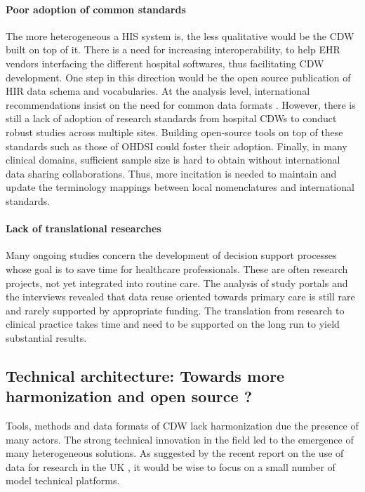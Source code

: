 \documentclass[french,12pt,twoside,a4paper]{book}
\begin{document}
\paragraph{Poor adoption of common standards} The more heterogeneous a HIS system is, the less qualitative would be the CDW
built on top of it. There is a need for increasing interoperability, to help EHR
vendors interfacing the different hospital softwares, thus facilitating CDW
development. One step in this direction would be the open source publication of
HIR data schema and vocabularies. At the analysis level, international recommendations insist
on the need for common data formats \citep{zhang_best_2022,kohane_what_2021}.
However, there is still a lack of adoption of research standards from hospital
CDWs to conduct robust studies across multiple sites. Building open-source tools
on top of these standards such as those of OHDSI \citep{schuemie_book_2021} could
foster their adoption. Finally, in many clinical domains, sufficient sample size
is hard to obtain without international data sharing collaborations. Thus, more
incitation is needed to maintain and update the terminology mappings between
local nomenclatures and international standards.

\paragraph{Lack of translational researches} Many ongoing studies concern the development of decision support processes whose
goal is to save time for healthcare professionals. These are often research
projects, not yet integrated into routine care. The analysis of study portals
and the interviews revealed that data reuse oriented towards primary care is
still rare and rarely supported by appropriate funding. The translation from
research to clinical practice takes time and need to be supported on the long
run to yield substantial results.

\subsection{Technical architecture: Towards more harmonization and open source
  ?}%
\label{subsec:cdw:recommendations:architecture} %

Tools, methods and data formats of CDW lack harmonization due the presence of
many actors. The strong technical innovation in the field led to the emergence
of many heterogeneous solutions. As suggested by the recent report on the use of
data for research in the UK \citep{goldacre_better_2022}, it would be wise to
focus on a small number of model technical platforms.
\end{document}
